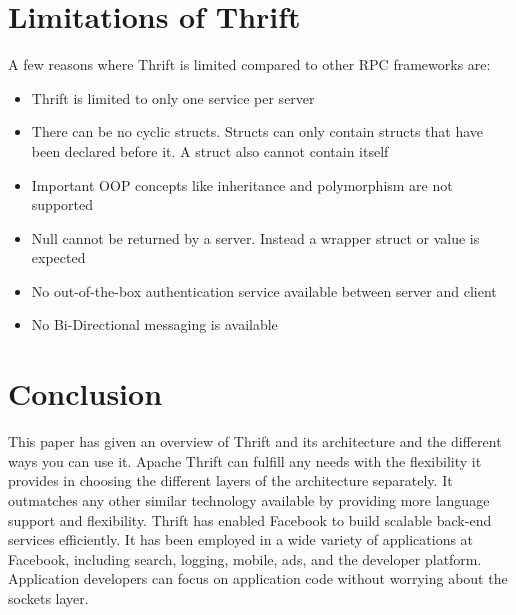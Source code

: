 \documentclass[9pt,twocolumn,twoside]{../../styles/osajnl}
\begin{document}
\section{Limitations of Thrift}
A few reasons where Thrift is limited compared to other RPC frameworks are:
\begin{itemize}
\item Thrift \cite{pdf-thrift-tutorial} is limited to only one service per server
\item There can be no cyclic structs. Structs can only contain structs that have been declared before it. A struct also cannot contain itself
\item Important OOP concepts like inheritance and polymorphism are not supported
\item Null cannot be returned by a server. Instead a wrapper struct or value is expected
\item No out-of-the-box authentication service available between server and client
\item No Bi-Directional messaging is available\\
\end{itemize}


\section{Conclusion}
This paper has given an overview of Thrift \cite{pdf-thrift-tutorial} and its architecture and the different ways you can use it.
Apache Thrift can fulfill any needs  with the flexibility it provides in choosing the different layers of the architecture separately. It outmatches any other similar technology available  by providing more language support and flexibility. Thrift has enabled Facebook to build scalable back-end services efficiently. It has been employed in a wide variety of applications at Facebook, including search, logging, mobile, ads, and the developer platform. Application developers can focus on application code without worrying about the sockets layer.


\end{document}
